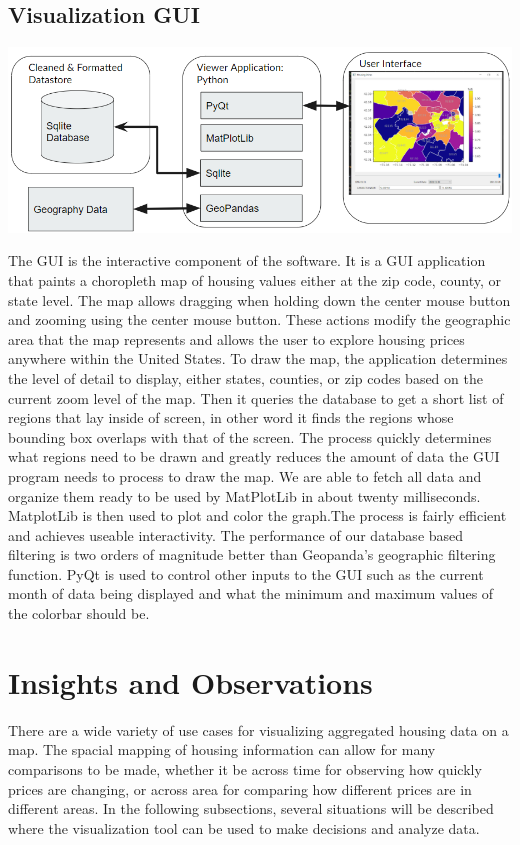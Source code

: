 \documentclass{article}
\begin{document}
\subsection{Visualization GUI}
\begin{center}
  \includegraphics[scale=0.5]{sysarch_gui.png} 
\end{center}  
The GUI is the interactive component of the software. It is a GUI application that paints a choropleth map of
housing values either at the zip code, county, or state level. The map allows dragging when holding down the
center mouse button and zooming using the center mouse button. These actions modify the geographic area that the 
map represents and allows the user to explore housing prices anywhere within the United States. 
To draw the map, the application determines the level of detail to display, either states, counties,
or zip codes based on the current zoom level of the map. Then it queries the database to get a short list of regions
that lay inside of screen, in other word it finds the regions whose bounding box overlaps with that of the screen.
The process quickly determines what regions need to be drawn and greatly reduces the amount of data the GUI program
needs to process to draw the map. We are able to fetch all data and organize them ready to be used by MatPlotLib in
about twenty milliseconds. MatplotLib is then used to plot and color the graph.The process is fairly efficient and achieves 
useable interactivity. The performance of our database based filtering is two orders of magnitude better than Geopanda's
geographic filtering function.
PyQt is used to control other inputs to the GUI such as the current month of data being displayed and what the minimum and maximum values of the colorbar should be.

\section{Insights and Observations}
There are a wide variety of use cases for visualizing aggregated housing data on a map. The spacial mapping of housing information can allow for many comparisons to be made, whether it be across time for observing how quickly prices are changing, or across area for comparing how different prices are in different areas. In the following subsections, several situations will be described where the visualization tool can be used to make decisions and analyze data.
\end{document}
